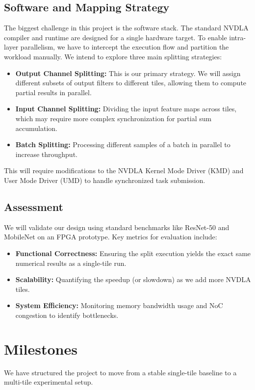 \documentclass[10pt,sigconf,nonacm]{acmart}
\begin{document}
\subsection{Software and Mapping Strategy}
The biggest challenge in this project is the software stack. The standard NVDLA compiler and runtime are designed for a single hardware target. To enable intra-layer parallelism, we have to intercept the execution flow and partition the workload manually. We intend to explore three main splitting strategies:
\begin{itemize}
    \item \textbf{Output Channel Splitting:} This is our primary strategy. We will assign different subsets of output filters to different tiles, allowing them to compute partial results in parallel.
    \item \textbf{Input Channel Splitting:} Dividing the input feature maps across tiles, which may require more complex synchronization for partial sum accumulation.
    \item \textbf{Batch Splitting:} Processing different samples of a batch in parallel to increase throughput.
\end{itemize}
This will require modifications to the NVDLA Kernel Mode Driver (KMD) and User Mode Driver (UMD) to handle synchronized task submission.

\subsection{Assessment}
We will validate our design using standard benchmarks like ResNet-50 and MobileNet on an FPGA prototype. Key metrics for evaluation include:
\begin{itemize}
    \item \textbf{Functional Correctness:} Ensuring the split execution yields the exact same numerical results as a single-tile run.
    \item \textbf{Scalability:} Quantifying the speedup (or slowdown) as we add more NVDLA tiles.
    \item \textbf{System Efficiency:} Monitoring memory bandwidth usage and NoC congestion to identify bottlenecks.
\end{itemize}

\section{Milestones}
\label{sec:milestones}
We have structured the project to move from a stable single-tile baseline to a multi-tile experimental setup.
\end{document}
